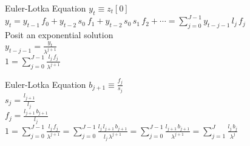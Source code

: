 \documentclass{beamer}
\begin{document}
\begin{frame}{Euler-Lotka Equation}
  $y_t \equiv z_t[0]$\\
  \vspace{.5cm}
  $y_t = y_{t-1} \, f_0 + y_{t-2} \, s_0 \ f_1 + y_{t-2} \, s_0 \, s_1 \, f_2 + \cdots = \displaystyle\sum\limits_{j=0}^{J-1} y_{t-j-1} \, l_j \, f_j$\\
  \vspace{.5cm}
  Posit an exponential solution\\
  \vspace{.5cm}
  $y_{t-j-1} = \frac{y_t}{\lambda^{j+1}}$\\
  \vspace{.5cm}
  $1 = \displaystyle\sum\limits_{j=0}^{J-1} \frac{l_j \, f_j}{\lambda^{j+1}}$\\
\end{frame}

\begin{frame}{Euler-Lotka Equation}
  \vspace{.5cm}
  $b_{j+1} \equiv \frac{f_j}{s_j}$\\
  \vspace{.5cm}
  $s_{j} = \frac{l_{j+1}}{l_j}$\\
  \vspace{.5cm}
  $f_j = \frac{l_{j+1} \, b_{j+1}}{l_j}$\\
  \vspace{.5cm}
  $1 = \displaystyle\sum\limits_{j=0}^{J-1} \frac{l_j \, f_j}{\lambda^{j+1}} = \displaystyle\sum\limits_{j=0}^{J-1} \frac{l_j \, l_{j+1} \, b_{j+1}}{l_j \, \lambda^{j+1}} = \displaystyle\sum\limits_{j=0}^{J-1} \frac{l_{j+1} \, b_{j+1}}{\lambda^{j+1}} = \displaystyle\sum\limits_{j=1}^{J} \frac{l_j \, b_j}{\lambda^j}$\\
  \vspace{.5cm}
\end{frame}
\end{document}
